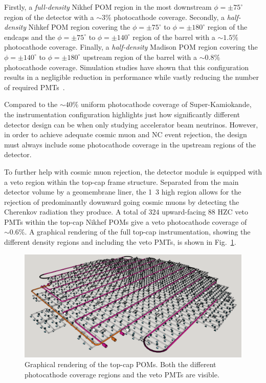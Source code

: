 Firstly, a \emph{full-density} Nikhef POM region in the most downstream $\phi=\pm75^{\circ}$
region of the detector with a $\sim3\%$ photocathode coverage. Secondly, a \emph{half-density}
Nihkef POM region covering the $\phi=\pm75^{\circ}$ to $\phi=\pm180^{\circ}$ region of the endcaps
and the $\phi=\pm75^{\circ}$ to $\phi=\pm140^{\circ}$ region of the barrel with a $\sim1.5\%$
photocathode coverage. Finally, a \emph{half-density} Madison POM region covering the
$\phi=\pm140^{\circ}$ to $\phi=\pm180^{\circ}$ upstream region of the barrel with a $\sim0.8\%$
photocathode coverage. Simulation studies have shown that this configuration results in a
negligible reduction in performance while vastly reducing the number of required
PMTs~\cite{blake2016}.

Compared to the $\sim40\%$ uniform photocathode coverage of Super-Kamiokande, the \chipsfive
instrumentation configuration highlights just how significantly different detector design can be
when only studying accelerator beam neutrinos. However, in order to achieve adequate cosmic muon
and NC event rejection, the design must always include some photocathode coverage in the upstream
regions of the detector.

To further help with cosmic muon rejection, the \chipsfive detector module is equipped with a veto
region within the top-cap frame structure. Separated from the main detector volume by a
geomembrane liner, the \unit{1.3}{} high region allows for the rejection of
predominantly downward going cosmic muons by detecting the Cherenkov radiation they produce. A
total of $324$ upward-facing \unit{88}{} HZC veto PMTs within the top-cap Nikhef POMs
give a veto photocathode coverage of $\sim0.6\%$. A graphical rendering of the full top-cap
instrumentation, showing the different density regions and including the veto PMTs, is shown in
Fig.~\ref{fig:top_cap}.

\begin{figure} %
    \includegraphics[width=\textwidth]{diagrams/4-chips/top_cap.png}
    \caption[Graphical rendering of the top-cap Planar Optical Modules]
    {Graphical rendering of the top-cap POMs. Both the different photocathode coverage regions and
        the veto PMTs are visible.}
    \label{fig:top_cap}
\end{figure}


